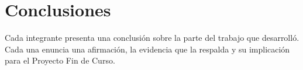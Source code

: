 \section{Conclusiones}\label{sec:conclusiones}

Cada integrante presenta una conclusión sobre la parte del trabajo que desarrolló. Cada una enuncia una afirmación, la evidencia que la respalda y su implicación para el Proyecto Fin de Curso.





